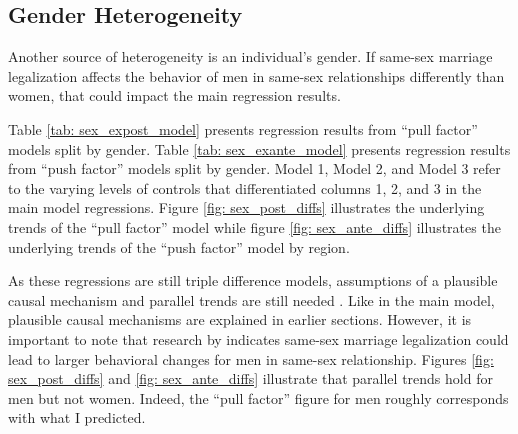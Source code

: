 \documentclass[12pt,letterpaper]{article}
\begin{document}

\clearpage
\subsection{Gender Heterogeneity}

Another source of heterogeneity is an individual’s gender. If same-sex marriage legalization affects the behavior of men in same-sex relationships differently than women, that could impact the main regression results.

Table \ref{tab: sex_expost_model} presents regression results from “pull factor” models split by gender. Table \ref{tab: sex_exante_model} presents regression results from “push factor” models split by gender. Model 1, Model 2, and Model 3 refer to the varying levels of controls that differentiated columns 1, 2, and 3 in the main model regressions.  Figure \ref{fig: sex_post_diffs} illustrates the underlying trends of the “pull factor” model while figure \ref{fig: sex_ante_diffs} illustrates the underlying trends of the “push factor” model by region.

As these regressions are still triple difference models, assumptions of a plausible causal mechanism and parallel trends are still needed \citep{24, 25}. Like in the main model, plausible causal mechanisms are explained in earlier sections. However, it is important to note that research by \citet{1, 12} indicates same-sex marriage legalization could lead to larger behavioral changes for men in same-sex relationship. Figures \ref{fig: sex_post_diffs} and \ref{fig: sex_ante_diffs} illustrate that parallel trends hold for men but not women. Indeed, the “pull factor” figure for men roughly corresponds with what I predicted.
\end{document}
